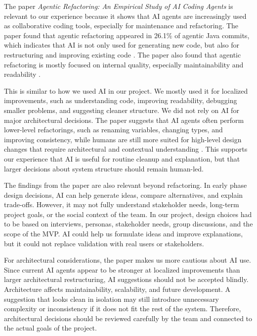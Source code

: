 The paper \textit{Agentic Refactoring: An Empirical Study of AI Coding Agents} is relevant to our
experience because it shows that AI agents are increasingly used as collaborative coding tools, 
especially for maintenance and refactoring.
The paper found that agentic refactoring appeared in 26.1\% of agentic Java commits, which indicates that AI is not only used for generating new code,
but also for restructuring and improving existing code \cite{Study_of_AI}.
The paper also found that agentic refactoring is mostly focused on internal quality, especially maintainability and readability \cite{Study_of_AI}.

This is similar to how we used AI in our project.
We mostly used it for localized improvements, such as understanding code, improving readability,
debugging smaller problems, and suggesting cleaner structure.
We did not rely on AI for major architectural decisions.
The paper suggests that AI agents often perform lower-level refactorings, such as renaming variables, changing types, and improving consistency, 
while humans are still more suited for high-level design changes that require architectural and contextual understanding \cite{Study_of_AI}.
This supports our experience that AI is useful for routine cleanup and explanation, but that larger decisions about system structure should remain human-led.

The findings from the paper are also relevant beyond refactoring.
In early phase design decisions, AI can help generate ideas, compare alternatives,
and explain trade-offs.
However, it may not fully understand stakeholder needs, long-term project goals, or the social context of the team.
In our project, design choices had to be based on interviews, personas, stakeholder needs, group discussions, and the scope of the MVP.
AI could help us formulate ideas and improve explanations, but it could not replace validation with real users or stakeholders.

For architectural considerations, the paper makes us more cautious about AI use. 
Since current AI agents appear to be stronger at localized improvements than larger architectural restructuring, 
AI suggestions should not be accepted blindly.
Architecture affects maintainability, scalability, and future development.
A suggestion that looks clean in isolation may still introduce unnecessary complexity or inconsistency if it does not fit the rest of the system. 
Therefore, architectural decisions should be reviewed carefully by the team and connected to the actual goals of the project.


